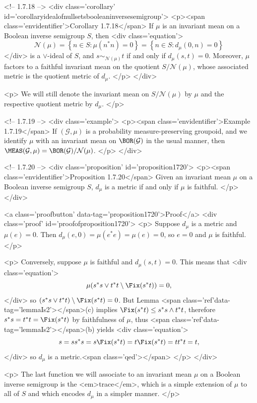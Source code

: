 <!-- 1.7.18 -->
<div class='corollary' id='corollaryidealofnullsetsbooleaninversesemigroup'>
	<p><span class='envidentifier'>Corollary 1.7.18</span>
	If $\mu$ is an invariant mean on a Boolean inverse semigroup $S$, then
	<div class='equation'>\[
	\mathcal{N}(\mu)=\left\{n\in S:\mu(n^*n)=0\right\}=\left\{n\in S:d_\mu(0,n)=0\right\}
	\]</div>
	is a $\lor$-ideal of $S$, and $s\sim_{\mathcal{N}(\mu)} t$ if and only if $d_\mu(s,t)=0$. Moreover, $\mu$ factors to a faithful invariant mean on the quotient $S/\mathcal{N}(\mu)$, whose associated metric is the quotient metric of $d_\mu$.
	</p>
</div>

<p>
We will still denote the invariant mean on $S/\mathcal{N}(\mu)$ by $\mu$ and the respective quotient metric by $d_\mu$.
</p>

<!-- 1.7.19 -->
<div class='example'>
<p><span class='envidentifier'>Example 1.7.19</span>
If $(\mathcal{G},\mu)$ is a probability measure-preserving groupoid, and we identify $\mu$ with an invariant mean on $\BOR(\mathcal{G})$ in the usual manner, then $\MEAS(\mathcal{G},\mu)=\BOR(\mathcal{G})/\mathcal{N}(\mu)$.
</p>
</div>

<!-- 1.7.20 -->
<div class='proposition' id='proposition1720'>
	<p><span class='envidentifier'>Proposition 1.7.20</span>
	Given an invariant mean $\mu$ on a Boolean inverse semigroup $S$, $d_\mu$ is a metric if and only if $\mu$ is faithful.
	</p>
</div>

<a class='proofbutton' data-tag='proposition1720'>Proof</a>
<div class='proof' id='proofofproposition1720'>
	<p>
	Suppose $d_\mu$ is a metric and $\mu(e)=0$. Then $d_\mu(e,0)=\mu(e^*e)=\mu(e)=0$, so $e=0$ and $\mu$ is faithful.
	</p>

	<p>
	Conversely, suppose $\mu$ is faithful and $d_\mu(s,t)=0$. This means that
	<div class='equation'>\[
	\mu(s^*s\lor t^*t\setminus\Fix(s^*t))=0,
	\]</div>
	so $(s^*s\lor t^*t)\setminus\Fix(s^*t)=0$. But Lemma <span class='ref'data-tag='lemmaIs2'></span>(c) implies $\Fix(s^*t)\leq s^*s\land t^*t$, therefore $s^*s=t^*t=\Fix(s^*t)$ by faithfulness of $\mu$, thus <span class='ref'data-tag='lemmaIs2'></span>(b) yields
	<div class='equation'>\[
	s=ss^*s=s\Fix(s^*t)=t\Fix(s^*t)=tt^*t=t,
	\]</div>
	so $d_\mu$ is a metric.<span class='qed'></span>
	</p>
</div>

<p>
The last function we will associate to an invariant mean $\mu$ on a Boolean inverse semigroup is the <em>trace</em>, which is a simple extension of $\mu$ to all of $S$ and which encodes $d_\mu$ in a simpler manner.
</p>

